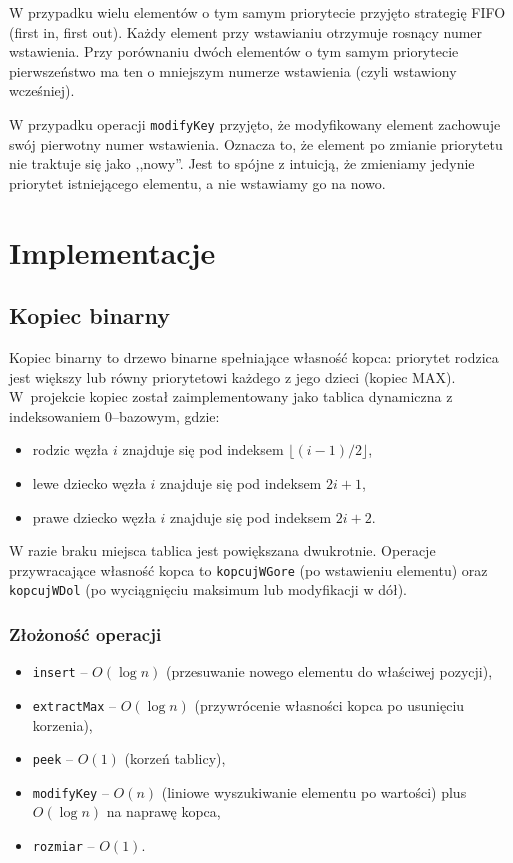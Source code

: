W przypadku wielu elementów o tym samym priorytecie przyjęto strategię FIFO
(first in, first out). Każdy element przy wstawianiu otrzymuje rosnący numer
wstawienia. Przy porównaniu dwóch elementów o tym samym priorytecie
pierwszeństwo ma ten o mniejszym numerze wstawienia (czyli wstawiony wcześniej).

W przypadku operacji \texttt{modifyKey} przyjęto, że modyfikowany element
zachowuje swój pierwotny numer wstawienia. Oznacza to, że element po zmianie
priorytetu nie traktuje się jako ,,nowy''. Jest to spójne z intuicją, że
zmieniamy jedynie priorytet istniejącego elementu, a nie wstawiamy go na nowo.

\section{Implementacje}

\subsection{Kopiec binarny}

Kopiec binarny to drzewo binarne spełniające własność kopca: priorytet rodzica
jest większy lub równy priorytetowi każdego z jego dzieci (kopiec MAX).
W~projekcie kopiec został zaimplementowany jako tablica dynamiczna z indeksowaniem
0--bazowym, gdzie:
\begin{itemize}
    \item rodzic węzła $i$ znajduje się pod indeksem $\lfloor (i-1)/2 \rfloor$,
    \item lewe dziecko węzła $i$ znajduje się pod indeksem $2i+1$,
    \item prawe dziecko węzła $i$ znajduje się pod indeksem $2i+2$.
\end{itemize}

W razie braku miejsca tablica jest powiększana dwukrotnie. Operacje przywracające
własność kopca to \texttt{kopcujWGore} (po wstawieniu elementu) oraz
\texttt{kopcujWDol} (po wyciągnięciu maksimum lub modyfikacji w dół).

\subsubsection*{Złożoność operacji}
\begin{itemize}
    \item \texttt{insert} -- $O(\log n)$ (przesuwanie nowego elementu do właściwej pozycji),
    \item \texttt{extractMax} -- $O(\log n)$ (przywrócenie własności kopca po usunięciu korzenia),
    \item \texttt{peek} -- $O(1)$ (korzeń tablicy),
    \item \texttt{modifyKey} -- $O(n)$ (liniowe wyszukiwanie elementu po wartości) plus $O(\log n)$ na naprawę kopca,
    \item \texttt{rozmiar} -- $O(1)$.
\end{itemize}

